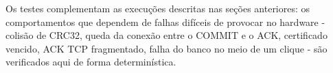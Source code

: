 Os testes complementam as execuções descritas nas seções anteriores: os comportamentos que dependem de falhas difíceis de provocar no hardware - colisão de CRC32, queda da conexão entre o COMMIT e o ACK, certificado vencido, ACK TCP fragmentado, falha do banco no meio de um clique - são verificados aqui de forma determinística.

\newpage
